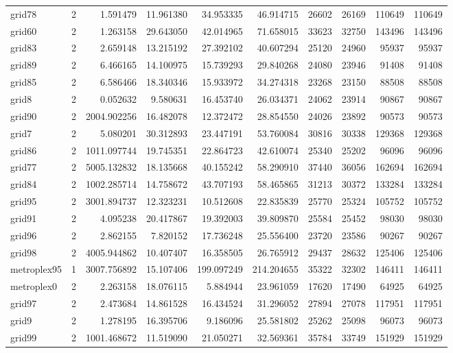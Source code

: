 \begin{longtable}{|l|r|r|r|r|r|r|r|r|r|}
grid78 & 2 & 1.591479 & 11.961380 & 34.953335 & 46.914715 & 26602 & 26169 & 110649 & 110649 \\
grid60 & 2 & 1.263158 & 29.643050 & 42.014965 & 71.658015 & 33623 & 32750 & 143496 & 143496 \\
grid83 & 2 & 2.659148 & 13.215192 & 27.392102 & 40.607294 & 25120 & 24960 & 95937 & 95937 \\
grid89 & 2 & 6.466165 & 14.100975 & 15.739293 & 29.840268 & 24080 & 23946 & 91408 & 91408 \\
grid85 & 2 & 6.586466 & 18.340346 & 15.933972 & 34.274318 & 23268 & 23150 & 88508 & 88508 \\
grid8 & 2 & 0.052632 & 9.580631 & 16.453740 & 26.034371 & 24062 & 23914 & 90867 & 90867 \\
grid90 & 2 & 2004.902256 & 16.482078 & 12.372472 & 28.854550 & 24026 & 23892 & 90573 & 90573 \\
grid7 & 2 & 5.080201 & 30.312893 & 23.447191 & 53.760084 & 30816 & 30338 & 129368 & 129368 \\
grid86 & 2 & 1011.097744 & 19.745351 & 22.864723 & 42.610074 & 25340 & 25202 & 96096 & 96096 \\
grid77 & 2 & 5005.132832 & 18.135668 & 40.155242 & 58.290910 & 37440 & 36056 & 162694 & 162694 \\
grid84 & 2 & 1002.285714 & 14.758672 & 43.707193 & 58.465865 & 31213 & 30372 & 133284 & 133284 \\
grid95 & 2 & 3001.894737 & 12.323231 & 10.512608 & 22.835839 & 25770 & 25324 & 105752 & 105752 \\
grid91 & 2 & 4.095238 & 20.417867 & 19.392003 & 39.809870 & 25584 & 25452 & 98030 & 98030 \\
grid96 & 2 & 2.862155 & 7.820152 & 17.736248 & 25.556400 & 23720 & 23586 & 90267 & 90267 \\
grid98 & 2 & 4005.944862 & 10.407407 & 16.358505 & 26.765912 & 29437 & 28632 & 125406 & 125406 \\
metroplex95 & 1 & 3007.756892 & 15.107406 & 199.097249 & 214.204655 & 35322 & 32302 & 146411 & 146411 \\
metroplex0 & 2 & 2.263158 & 18.076115 & 5.884944 & 23.961059 & 17620 & 17490 & 64925 & 64925 \\
grid97 & 2 & 2.473684 & 14.861528 & 16.434524 & 31.296052 & 27894 & 27078 & 117951 & 117951 \\
grid9 & 2 & 1.278195 & 16.395706 & 9.186096 & 25.581802 & 25262 & 25098 & 96073 & 96073 \\
grid99 & 2 & 1001.468672 & 11.519090 & 21.050271 & 32.569361 & 35784 & 33749 & 151929 & 151929 \\

\end{longtable}
